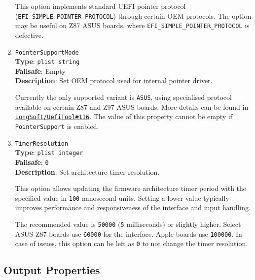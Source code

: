 \documentclass[]{article}
\begin{document}
\begin{enumerate}
  This option implements standard UEFI pointer protocol (\texttt{EFI\_SIMPLE\_POINTER\_PROTOCOL})
  through certain OEM protocols. The option may be useful on Z87 ASUS boards, where
  \texttt{EFI\_SIMPLE\_POINTER\_PROTOCOL} is defective.

\item
  \texttt{PointerSupportMode}\\
  \textbf{Type}: \texttt{plist\ string}\\
  \textbf{Failsafe}: Empty\\
  \textbf{Description}: Set OEM protocol used for internal pointer driver.

  Currently the only supported variant is \texttt{ASUS}, using specialised protocol available
  on certain Z87 and Z97 ASUS boards. More details can be found in
  \href{https://github.com/LongSoft/UEFITool/pull/116}{\texttt{LongSoft/UefiTool\#116}}.
  The value of this property cannot be empty if \texttt{PointerSupport} is enabled.

\item
  \texttt{TimerResolution}\\
  \textbf{Type}: \texttt{plist\ integer}\\
  \textbf{Failsafe}: \texttt{0}\\
  \textbf{Description}: Set architecture timer resolution.

  This option allows updating the firmware architecture timer period with the specified value
  in \texttt{100} nanosecond units. Setting a lower value typically improves performance
  and responsiveness of the interface and input handling.

  The recommended value is \texttt{50000} (\texttt{5} milliseconds) or slightly higher. Select
  ASUS Z87 boards use \texttt{60000} for the interface. Apple boards use \texttt{100000}.
  In case of issues, this option can be left as \texttt{0} to not change the timer resolution.

\end{enumerate}

\subsection{Output Properties}\label{uefioutputprops}
\end{document}
